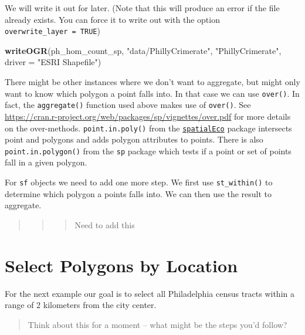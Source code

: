 \documentclass[]{book}
\newenvironment{Shaded}{\begin{snugshade}}{\end{snugshade}}
\newcommand{\KeywordTok}[1]{\textcolor[rgb]{0.13,0.29,0.53}{\textbf{#1}}}
\newcommand{\DataTypeTok}[1]{\textcolor[rgb]{0.13,0.29,0.53}{#1}}
\newcommand{\StringTok}[1]{\textcolor[rgb]{0.31,0.60,0.02}{#1}}
\newcommand{\NormalTok}[1]{#1}
\theoremstyle{definition}
\theoremstyle{definition}
\theoremstyle{definition}
\theoremstyle{remark}
\begin{document}
We will write it out for later. (Note that this will produce an error if
the file already exists. You can force it to write out with the option
\texttt{overwrite\_layer\ =\ TRUE})

\begin{Shaded}
\begin{Highlighting}[]
\KeywordTok{writeOGR}\NormalTok{(ph_hom_count_sp, }\StringTok{"data/PhillyCrimerate"}\NormalTok{, }\StringTok{"PhillyCrimerate"}\NormalTok{, }\DataTypeTok{driver =} \StringTok{"ESRI Shapefile"}\NormalTok{)}
\end{Highlighting}
\end{Shaded}

There might be other instances where we don't want to aggregate, but
might only want to know which polygon a point falls into. In that case
we can use \texttt{over()}. In fact, the \texttt{aggregate()} function
used above makes use of \texttt{over()}. See
\url{https://cran.r-project.org/web/packages/sp/vignettes/over.pdf} for
more details on the over-methods. \texttt{point.in.poly()} from the
\href{https://cran.r-project.org/package=spatialEco}{\texttt{spatialEco}}
package intersects point and polygons and adds polygon attributes to
points. There is also \texttt{point.in.polygon()} from the \texttt{sp}
package which tests if a point or set of points fall in a given polygon.

For \texttt{sf} objects we need to add one more step. We first use
\texttt{st\_within()} to determine which polygon a points falls into. We
can then use the result to aggregate.

\begin{quote}
\begin{quote}
\begin{quote}
Need to add this
\end{quote}
\end{quote}
\end{quote}

\section{Select Polygons by Location}\label{select-polygons-by-location}

For the next example our goal is to select all Philadelphia census
tracts within a range of 2 kilometers from the city center.

\begin{quote}
Think about this for a moment -- what might be the steps you'd follow?
\end{quote}
\end{document}
